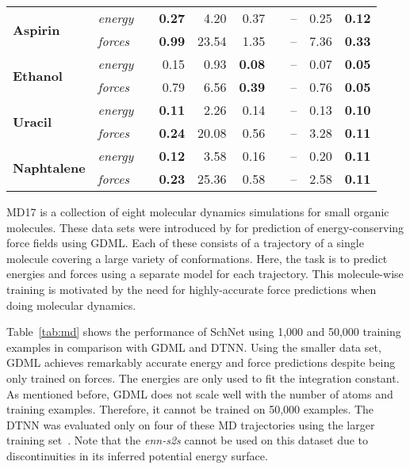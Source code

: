 \documentclass{article}
\begin{document}
\begin{table}
\begin{tabular}{llrrrrrrrr}
\multirow{2}{*}{\textbf{Aspirin}}        & \textit{energy} & & \textbf{0.27} & 4.20  & 0.37 && -- & 0.25 & \textbf{0.12} \\
          						 & \textit{forces} & & \textbf{0.99} & 23.54 & 1.35 && -- & 7.36 & \textbf{0.33} \\ \cmidrule{1-2} \cmidrule{4-6} \cmidrule{8-10}
\multirow{2}{*}{\textbf{Ethanol}}        & \textit{energy} & & 0.15 & 0.93 & \textbf{0.08}  && -- & 0.07 & \textbf{0.05} \\
  						         & \textit{forces} & & 0.79 & 6.56 & \textbf{0.39}  && -- & 0.76 & \textbf{0.05} \\ \cmidrule{1-2} \cmidrule{4-6} \cmidrule{8-10}
\multirow{2}{*}{\textbf{Uracil}}         & \textit{energy} & & \textbf{0.11} & 2.26 & 0.14  && -- & 0.13 & \textbf{0.10} \\
        						 & \textit{forces} & & \textbf{0.24} & 20.08 & 0.56 && -- & 3.28 & \textbf{0.11} \\
\cmidrule{1-2} \cmidrule{4-6} \cmidrule{8-10}
\multirow{2}{*}{\textbf{Naphtalene}}     & \textit{energy} & & \textbf{0.12} & 3.58 & 0.16  && -- & 0.20 & \textbf{0.11} \\
        						 & \textit{forces} & & \textbf{0.23} & 25.36 & 0.58 && -- & 2.58 & \textbf{0.11} \\        						 
\bottomrule
\end{tabular}
\end{table}
MD17 is a collection of eight molecular dynamics simulations for small organic molecules.
These data sets were introduced by \citet{chmiela2017machine} for prediction of energy-conserving force fields using GDML.
Each of these consists of a trajectory of a single molecule covering a large variety of conformations.
Here, the task is to predict energies and forces using a separate model for each trajectory.
This molecule-wise training is motivated by the need for highly-accurate force predictions when doing molecular dynamics.

Table~\ref{tab:md} shows the performance of SchNet using 1,000 and 50,000 training examples in comparison with GDML and DTNN.
Using the smaller data set, GDML achieves remarkably accurate energy and force predictions despite being only trained on forces.
The energies are only used to fit the integration constant.
As mentioned before, GDML does not scale well with the number of atoms and training examples.
Therefore, it cannot be trained on 50,000 examples.
The DTNN was evaluated only on four of these MD trajectories using the larger training set~\citep{schutt2017quantum}.
Note that the \emph{enn-s2s} cannot be used on this dataset due to discontinuities in its inferred potential energy surface.
\end{document}

